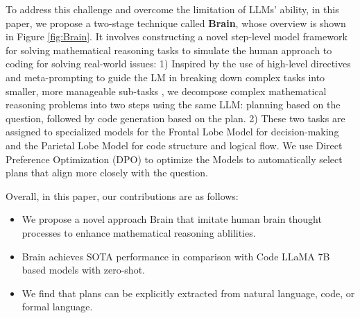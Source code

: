\documentclass[11pt]{article}
\begin{document}
To address this challenge and overcome the limitation of LLMs' ability, in this paper, we propose a two-stage technique called \textbf{Brain}, whose overview is shown in Figure \ref{fig:Brain}. It involves constructing a novel step-level model framework for solving mathematical reasoning tasks to simulate the human approach to coding for solving real-world issues: 1) Inspired by the use of high-level directives and meta-prompting to guide the LM in breaking down complex tasks into smaller, more manageable sub-tasks \citep{hongMetaGPTMetaProgramming2023, suzgunMetaPromptingEnhancingLanguage2024}, we decompose complex mathematical reasoning problems into two steps using the same LLM: planning based on the question, followed by code generation based on the plan. 2) These two tasks are assigned to specialized models for the Frontal Lobe Model for decision-making and the Parietal Lobe Model for code structure and logical flow. We use Direct Preference Optimization (DPO) to optimize the Models to automatically select plans that align more closely with the question. 


Overall, in this paper, our contributions are as follows: 

\begin{itemize}
    \item We propose a novel approach Brain that imitate human brain thought processes to enhance mathematical reasoning ablilities.
    \item Brain achieves SOTA performance in comparison with Code LLaMA 7B based models with zero-shot.
    \item We find that plans can be explicitly extracted from natural language, code, or formal language.
\end{itemize}
\end{document}
